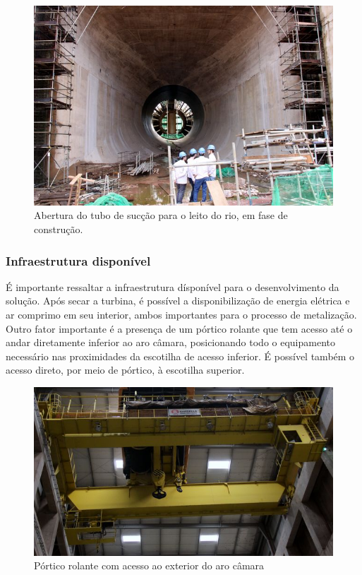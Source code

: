 \begin{figure}[H]	
	\includegraphics[width=\columnwidth]{sota/figs/viagem/img_5086}
	\caption{Abertura do tubo de sucção para o leito do rio, em fase de
	construção.}
	\label{fig::tubo_suc}
\end{figure}

\subsubsection{Infraestrutura disponível}
É importante ressaltar a infraestrutura dísponível para o desenvolvimento da solução. 
Após secar a turbina, é possível a disponibilização de energia elétrica e ar
comprimo em seu interior, ambos importantes para o processo de metalização. Outro fator 
importante é a presença de um pórtico rolante que tem acesso até o andar diretamente 
inferior ao aro câmara, posicionando todo o equipamento necessário nas proximidades 
da escotilha de acesso inferior. É possível também o acesso direto, por meio de pórtico, 
à escotilha superior.

\begin{figure}[h!]	
	\includegraphics[width=\columnwidth]{sota/figs/viagem/img_4989}
	\caption{Pórtico rolante com acesso ao exterior do aro câmara}
	\label{fig::portico}
\end{figure}


